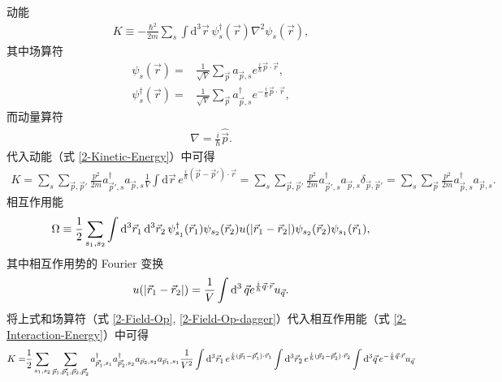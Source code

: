 \documentclass{assignment}
\begin{document}
\begin{pf}
    动能
    \begin{align}
        K\equiv-\frac{\hbar^2}{2m}\sum_s\int\mathrm{d}^3\vec{r}\,\psi_s^{\dagger}(\vec{r})\nabla^2\psi_s(\vec{r}),
    \end{align}
    其中场算符
    \begin{align}
        \label{2-Field-Op}
        \psi_s(\vec{r})=&\frac{1}{\sqrt{V}}\sum_{\vec{p}}a_{\vec{p},s}e^{\frac{i}{\hbar}\vec{p}\cdot\vec{r}},\\
        \label{2-Field-Op-dagger}
        \psi_s^{\dagger}(\vec{r})=&\frac{1}{\sqrt{V}}\sum_{\vec{p}}a_{\vec{p},s}^{\dagger}e^{-\frac{i}{\hbar}\vec{p}\cdot\vec{r}},
    \end{align}
    而动量算符
    \begin{align}
        \nabla=\frac{i}{\hbar}\hat{\vec{p}}.
    \end{align}
    代入动能（式 \eqref{2-Kinetic-Energy}）中可得
    \begin{align}
        K=\sum_s\sum_{\vec{p},\vec{p}'}\frac{p^2}{2m}a_{\vec{p}',s}^{\dagger}a_{\vec{p},s}\frac{1}{V}\int\mathrm{d}\vec{r}\,e^{\frac{i}{\hbar}(\vec{p}-\vec{p}')\cdot\vec{r}}=\sum_s\sum_{\vec{p},\vec{p}'}\frac{p^2}{2m}a_{\vec{p}',s}^{\dagger}a_{\vec{p},s}\delta_{\vec{p},\vec{p}'}=\sum_s\sum_{\vec{p}}\frac{p^2}{2m}a_{\vec{p},s}^{\dagger}a_{\vec{p},s}.
    \end{align}
    相互作用能
    \begin{align}
        \label{2-Interaction-Energy}
        \Omega\equiv\frac{1}{2}\sum_{s_1,s_2}\int\mathrm{d}^3\vec{r}_1\,\mathrm{d}^3\vec{r}_2\,\psi_{s_1}^{\dagger}(\vec{r}_1)\psi_{s_2}(\vec{r}_2)u(\left\lvert\vec{r}_1-\vec{r}_2\right\rvert)\psi_{s_2}(\vec{r}_2)\psi_{s_1}(\vec{r}_1),
    \end{align}
    其中相互作用势的 Fourier 变换
    \begin{align}
        u(\left\lvert\vec{r}_1-\vec{r}_2\right\rvert)=\frac{1}{V}\int\mathrm{d}^3\,\vec{q}e^{\frac{i}{\hbar}\vec{q}\cdot\vec{r}}u_{\vec{q}}.
    \end{align}
    将上式和场算符（式 \eqref{2-Field-Op}, \eqref{2-Field-Op-dagger}）代入相互作用能（式 \eqref{2-Interaction-Energy}）中可得
    \begin{align}
        \notag K=&\frac{1}{2}\sum_{s_1,s_2}\sum_{\vec{p}_1,\vec{p}_1',\vec{p}_2,\vec{p}_2'}a_{\vec{p}_1',s_1}^{\dagger}a_{\vec{p}_2',s_2}^{\dagger}a_{\vec{p}_2,s_2}a_{\vec{p}_1,s_1}\frac{1}{V^2}\int\mathrm{d}^3\vec{r}_1\,e^{\frac{i}{\hbar}(\vec{p}_1-\vec{p}_1')\cdot\vec{r}_1}\int\mathrm{d}^3\vec{r}_2\,e^{\frac{i}{\hbar}(\vec{p}_2-\vec{p}_2')\cdot\vec{r}_2}\int\mathrm{d}^3\vec{q}\,e^{-\frac{i}{\hbar}\vec{q}\cdot\vec{r}}u_{\vec{q}}\\

\end{align}
\end{pf}
\end{document}
